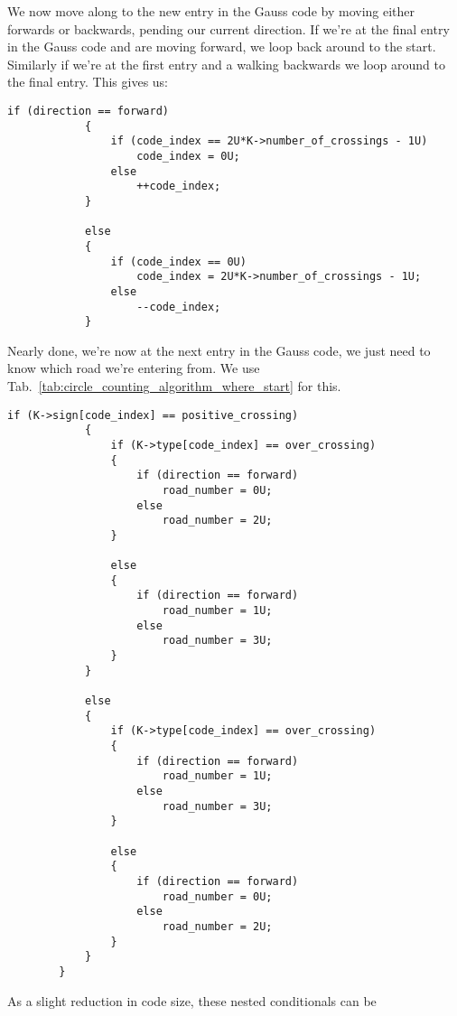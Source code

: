         We now move along to the new entry in the Gauss code by moving either
        forwards or backwards, pending our current direction. If we're at the
        final entry in the Gauss code and are moving forward, we loop back
        around to the start. Similarly if we're at the first entry and a walking
        backwards we loop around to the final entry. This gives us:
\begin{lstlisting}[style=CStyle, firstnumber=102]
            if (direction == forward)
            {
                if (code_index == 2U*K->number_of_crossings - 1U)
                    code_index = 0U;
                else
                    ++code_index;
            }

            else
            {
                if (code_index == 0U)
                    code_index = 2U*K->number_of_crossings - 1U;
                else
                    --code_index;
            }
\end{lstlisting}
        Nearly done, we're now at the next entry in the Gauss code, we just need
        to know which road we're entering from. We use
        Tab.~\ref{tab:circle_counting_algorithm_where_start} for this.
\begin{lstlisting}[style=CStyle, firstnumber = 118]
            if (K->sign[code_index] == positive_crossing)
            {
                if (K->type[code_index] == over_crossing)
                {
                    if (direction == forward)
                        road_number = 0U;
                    else
                        road_number = 2U;
                }

                else
                {
                    if (direction == forward)
                        road_number = 1U;
                    else
                        road_number = 3U;
                }
            }

            else
            {
                if (K->type[code_index] == over_crossing)
                {
                    if (direction == forward)
                        road_number = 1U;
                    else
                        road_number = 3U;
                }

                else
                {
                    if (direction == forward)
                        road_number = 0U;
                    else
                        road_number = 2U;
                }
            }
        }
\end{lstlisting}
        As a slight reduction in code size, these nested conditionals can be
